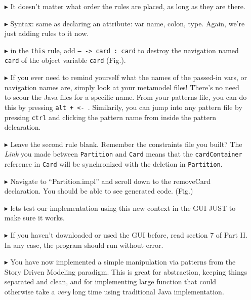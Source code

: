 \begin{itemize}
\item[$\blacktriangleright$] It doesn't matter what order the rules are placed, as long as they are there.

\item[$\blacktriangleright$] Syntax: same as declaring an attribute: var name, colon, type. Again, we're just adding rules to it now.

\item[$\blacktriangleright$] in the \texttt{this} rule, add \texttt{-- -> card : card} to destroy the navigation named \texttt{card} of the object variable
\texttt{card} (Fig.).

\item[$\blacktriangleright$] If you ever need to remind yourself what the names of the passed-in vars, or navigation names are, simply look at your metamodel
files! There's no need to scour the Java files for a specific name. From your patterns file, you can do this by pressing \texttt{alt + <- }. Similarily, you can
jump into any pattern file by pressing \texttt{ctrl} and clicking the pattern name from inside the pattern delcaration.

\item[$\blacktriangleright$] Leave the second rule blank. Remember the constraints file you built? The \emph{Link} you made between \texttt{Partition} and
\texttt{Card} means that the \texttt{cardContainer} reference in \texttt{Card} will be synchronized with the deletion in \texttt{Partition}.

\item[$\blacktriangleright$] Navigate to ``Partition.impl'' and scroll down to the removeCard declaration. You should be able to see generated code. (Fig.)

\item[$\blacktriangleright$] lets test our implementation using this new context in the GUI JUST to make sure it works.

\item[$\blacktriangleright$] If you haven't downloaded or used the GUI before, read section 7 of Part II. In any case, the program should run without error.

\item[$\blacktriangleright$] You have now implemented a simple manipulation via patterns from the Story Driven Modeling paradigm. This is great for abstraction,
keeping things separated and clean, and for implementing large function that could otherwise take a \emph{very} long time using traditional Java
implementation.


\end{itemize}
